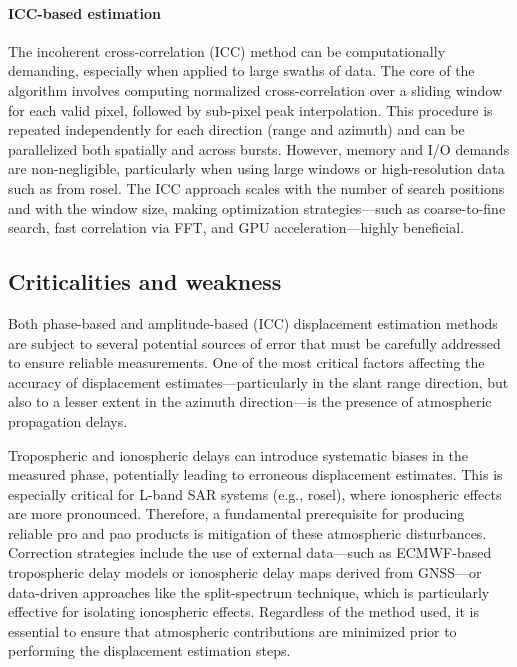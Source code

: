\paragraph{ICC-based estimation}

The incoherent cross-correlation (ICC) method can be computationally demanding, especially when applied to large swaths of data. The core of the algorithm involves computing normalized cross-correlation over a sliding window for each valid pixel, followed by sub-pixel peak interpolation. This procedure is repeated independently for each direction (range and azimuth) and can be parallelized both spatially and across bursts. However, memory and I/O demands are non-negligible, particularly when using large windows or high-resolution data such as from \acs{rosel}. The ICC approach scales with the number of search positions and with the window size, making optimization strategies—such as coarse-to-fine search, fast correlation via FFT, and GPU acceleration—highly beneficial. 

\subsection{Criticalities and weakness}
\label{sec:pro_pao_criticalities}

Both phase-based and amplitude-based (ICC) displacement estimation methods are subject to several potential sources of error that must be carefully addressed to ensure reliable measurements. One of the most critical factors affecting the accuracy of displacement estimates—particularly in the slant range direction, but also to a lesser extent in the azimuth direction—is the presence of atmospheric propagation delays.

Tropospheric and ionospheric delays can introduce systematic biases in the measured phase, potentially leading to erroneous displacement estimates. This is especially critical for L-band SAR systems (e.g., \acs{rosel}), where ionospheric effects are more pronounced. Therefore, a fundamental prerequisite for producing reliable \acs{pro} and \acs{pao} products is mitigation of these atmospheric disturbances. Correction strategies include the use of external data—such as ECMWF-based tropospheric delay models or ionospheric delay maps derived from GNSS—or data-driven approaches like the split-spectrum technique, which is particularly effective for isolating ionospheric effects. Regardless of the method used, it is essential to ensure that atmospheric contributions are minimized prior to performing the displacement estimation steps.

